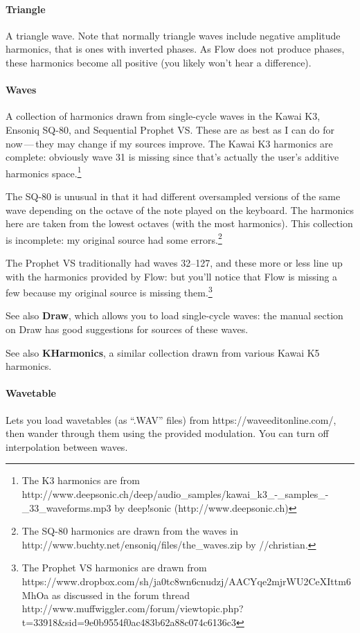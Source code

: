\documentclass{article}
\newcommand\name{Flow}
\begin{document}
\paragraph{Triangle}  A triangle wave.  Note that normally triangle waves include negative amplitude harmonics, that is ones with inverted phases.  As {\name} does not produce phases, these harmonics become all positive (you likely won't hear a difference).

\paragraph{Waves}  A collection of harmonics drawn from single-cycle waves in the Kawai K3, Ensoniq SQ-80, and Sequential Prophet VS.  These are as best as I can do for now\,---\,they may change if my sources improve.  The Kawai K3 harmonics are complete: obviously wave 31 is missing since that's actually the user's additive harmonics space.\footnote{The K3 harmonics are from http:/\!/www.deepsonic.ch/deep/audio\_samples/kawai\_k3\_-\_samples\_-\_33\_waveforms.mp3 by deep!sonic (http:/\!/www.deepsonic.ch)}

The SQ-80 is unusual in that it had different oversampled versions of the same wave depending on the octave of the note played on the keyboard.  The harmonics here are taken from the lowest octaves (with the most harmonics).  This collection is incomplete: my original source had some errors.\footnote{The SQ-80 harmonics are drawn from the waves in http:/\!/www.buchty.net/ensoniq/files/the\_waves.zip by //christian.}

The Prophet VS traditionally had waves 32--127, and these more or less line up with the harmonics provided by Flow: but you'll notice that Flow is missing a few because my original source is missing them.\footnote{The Prophet VS harmonics are drawn from https:/\!/www.dropbox.com/sh/ja0tc8wn6cnudzj/AACYqe2mjrWU2CeXIttm6MhOa as discussed in the forum thread http:/\!/www.muffwiggler.com/forum/viewtopic.php?t=33918\&sid=9e0b9554f0ac483b62a88c074c6136c3}

See also {\bf Draw}, which allows you to load single-cycle waves: the manual section on Draw has good suggestions for sources of these waves.

See also {\bf KHarmonics}, a similar collection drawn from various Kawai K5 harmonics.

\paragraph{Wavetable}  Lets you load wavetables (as ``.WAV'' files) from https:/\!/waveeditonline.com/, then wander through them using the provided modulation.  You can turn off interpolation between waves.
\end{document}
